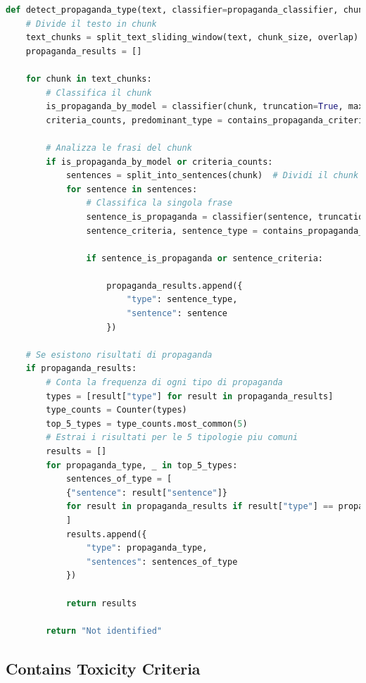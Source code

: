 \documentclass{article}
\begin{document}
	\begin{lstlisting}[language=python]
def detect_propaganda_type(text, classifier=propaganda_classifier, chunk_size=512, overlap=128):
	# Divide il testo in chunk
	text_chunks = split_text_sliding_window(text, chunk_size, overlap)
	propaganda_results = []

	for chunk in text_chunks:
		# Classifica il chunk
		is_propaganda_by_model = classifier(chunk, truncation=True, max_length=chunk_size)[0]['label'] == "propaganda"
		criteria_counts, predominant_type = contains_propaganda_criteria(chunk)

		# Analizza le frasi del chunk
		if is_propaganda_by_model or criteria_counts:
			sentences = split_into_sentences(chunk)  # Dividi il chunk in frasi
			for sentence in sentences:
				# Classifica la singola frase
				sentence_is_propaganda = classifier(sentence, truncation=True)[0]['label'] == "propaganda"
				sentence_criteria, sentence_type = contains_propaganda_criteria(sentence)
				
				if sentence_is_propaganda or sentence_criteria:

					propaganda_results.append({
						"type": sentence_type,
						"sentence": sentence
					})

	# Se esistono risultati di propaganda
	if propaganda_results:
		# Conta la frequenza di ogni tipo di propaganda
		types = [result["type"] for result in propaganda_results]
		type_counts = Counter(types)
		top_5_types = type_counts.most_common(5)
		# Estrai i risultati per le 5 tipologie piu comuni
		results = []
		for propaganda_type, _ in top_5_types:
			sentences_of_type = [
			{"sentence": result["sentence"]}
			for result in propaganda_results if result["type"] == propaganda_type
			]
			results.append({
				"type": propaganda_type,
				"sentences": sentences_of_type
			})
			
			return results
			
		return "Not identified"

	\end{lstlisting}
	
		\subsection{Contains Toxicity Criteria}
\end{document}
